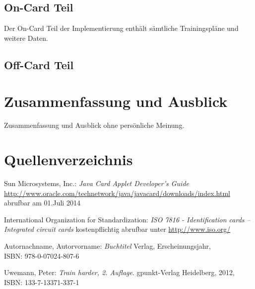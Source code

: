 \documentclass[a4paper,12pt]{scrartcl}
\begin{document}
\subsection{On-Card Teil}
\label{subsec:3.2}
Der On-Card Teil der Implementierung enthält sämtliche Trainingspläne und weitere Daten.



\subsection{Off-Card Teil}
\label{subsec:3.3}


\clearpage
\section{Zusammenfassung und Ausblick}
\label{sec:5}
Zusammenfassung und Ausblick ohne persönliche Meinung.

\clearpage
\section{Quellenverzeichnis}
\label{sec:6}
\renewcommand\refname{Quellenverzeichnis}
\begin{thebibliography}{999}

Sun Microsystems, Inc.:  {\sl Java Card Applet Developer's Guide}\\
\url{http://www.oracle.com/technetwork/java/javacard/downloads/index.html}\\
abrufbar am 01.Juli 2014

International Organization for Standardization: {\sl ISO 7816 - Identification cards -- Integrated circuit cards}
kostenpflichtig abrufbar unter \url{http://www.iso.org/}

Autornachname, Autorvorname:  {\sl Buchtitel} Verlag, Erscheinungsjahr,
\\ISBN:  978-0-07024-807-6

Uwemann, Peter:  {\sl Train harder, 2. Auflage}. gpunkt-Verlag Heidelberg, 2012,
\\ISBN: 133-7-13371-337-1


\end{thebibliography}
\end{document}
